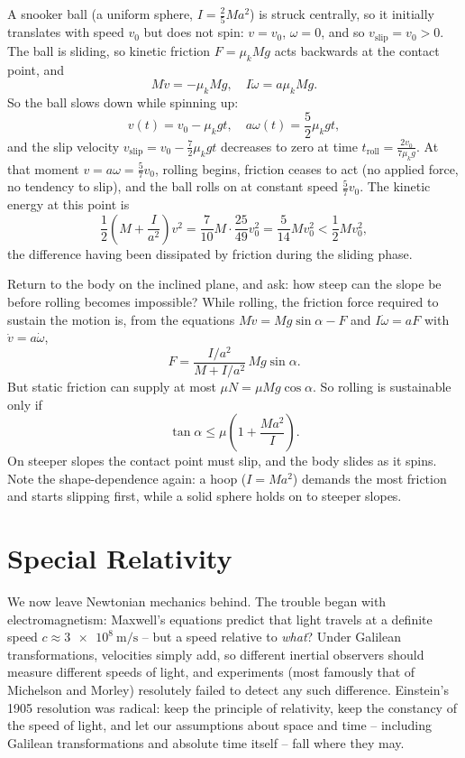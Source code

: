 \documentclass[a4paper]{scrartcl}
\begin{document}
\begin{example}
	A snooker ball (a uniform sphere, $I = \frac{2}{5}Ma^2$) is struck centrally, so it initially translates with speed $v_0$ but does not spin: $v = v_0$, $\omega = 0$, and so $v_{\text{slip}} = v_0 > 0$. The ball is sliding, so kinetic friction $F = \mu_k M g$ acts backwards at the contact point, and
	$$
	M \dot{v} = -\mu_k Mg, \quad I \dot{\omega} = a \mu_k M g.
	$$
	So the ball slows down while spinning up:
	$$
	v(t) = v_0 - \mu_k g t, \quad a\omega(t) = \frac{5}{2}\mu_k g t,
	$$
	and the slip velocity $v_{\text{slip}} = v_0 - \frac{7}{2}\mu_k g t$ decreases to zero at time $t_{\text{roll}} = \frac{2 v_0}{7 \mu_k g}$. At that moment $v = a\omega = \frac{5}{7}v_0$, rolling begins, friction ceases to act (no applied force, no tendency to slip), and the ball rolls on at constant speed $\frac{5}{7}v_0$. The kinetic energy at this point is
	$$
	\frac{1}{2}\left(M + \frac{I}{a^2}\right)v^2 = \frac{7}{10}M \cdot \frac{25}{49}v_0^2 = \frac{5}{14}Mv_0^2 < \frac{1}{2}Mv_0^2,
	$$
	the difference having been dissipated by friction during the sliding phase.
\end{example}

\begin{example}
	Return to the body on the inclined plane, and ask: how steep can the slope be before rolling becomes impossible? While rolling, the friction force required to sustain the motion is, from the equations $M \dot v = Mg\sin\alpha - F$ and $I \dot\omega = aF$ with $\dot v = a \dot \omega$,
	$$
	F = \frac{I/a^2}{M + I/a^2}\, Mg \sin\alpha.
	$$
	But static friction can supply at most $\mu N = \mu Mg \cos\alpha$. So rolling is sustainable only if
	$$
	\tan \alpha \leq \mu\left(1 + \frac{Ma^2}{I}\right).
	$$
	On steeper slopes the contact point must slip, and the body slides as it spins. Note the shape-dependence again: a hoop ($I = Ma^2$) demands the most friction and starts slipping first, while a solid sphere holds on to steeper slopes.
\end{example}
\section{Special Relativity} \label{sec:sr}

We now leave Newtonian mechanics behind. The trouble began with electromagnetism: Maxwell's equations predict that light travels at a definite speed $c \approx \SI{3e8}{\meter\per\second}$ -- but a speed relative to \emph{what}? Under Galilean transformations, velocities simply add, so different inertial observers should measure different speeds of light, and experiments (most famously that of Michelson and Morley) resolutely failed to detect any such difference. Einstein's 1905 resolution was radical: keep the principle of relativity, keep the constancy of the speed of light, and let our assumptions about space and time -- including Galilean transformations and absolute time itself -- fall where they may.
\end{document}
